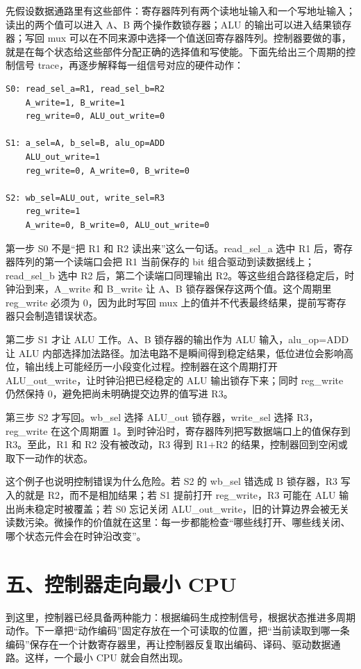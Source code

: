 先假设数据通路里有这些部件：寄存器阵列有两个读地址输入和一个写地址输入；读出的两个值可以进入 A、B 两个操作数锁存器；ALU 的输出可以进入结果锁存器；写回 mux 可以在不同来源中选择一个值送回寄存器阵列。控制器要做的事，就是在每个状态给这些部件分配正确的选择值和写使能。下面先给出三个周期的控制信号 trace，再逐步解释每一组信号对应的硬件动作：

\begin{lstlisting}
S0: read_sel_a=R1, read_sel_b=R2
    A_write=1, B_write=1
    reg_write=0, ALU_out_write=0

S1: a_sel=A, b_sel=B, alu_op=ADD
    ALU_out_write=1
    reg_write=0, A_write=0, B_write=0

S2: wb_sel=ALU_out, write_sel=R3
    reg_write=1
    A_write=0, B_write=0, ALU_out_write=0
\end{lstlisting}

第一步 S0 不是“把 R1 和 R2 读出来”这么一句话。read\_sel\_a 选中 R1 后，寄存器阵列的第一个读端口会把 R1 当前保存的 bit 组合驱动到读数据线上；read\_sel\_b 选中 R2 后，第二个读端口同理输出 R2。等这些组合路径稳定后，时钟沿到来，A\_write 和 B\_write 让 A、B 锁存器保存这两个值。这个周期里 reg\_write 必须为 0，因为此时写回 mux 上的值并不代表最终结果，提前写寄存器只会制造错误状态。

第二步 S1 才让 ALU 工作。A、B 锁存器的输出作为 ALU 输入，alu\_op=ADD 让 ALU 内部选择加法路径。加法电路不是瞬间得到稳定结果，低位进位会影响高位，输出线上可能经历一小段变化过程。控制器在这个周期打开 ALU\_out\_write，让时钟沿把已经稳定的 ALU 输出锁存下来；同时 reg\_write 仍然保持 0，避免把尚未明确提交边界的值写进 R3。

第三步 S2 才写回。wb\_sel 选择 ALU\_out 锁存器，write\_sel 选择 R3，reg\_write 在这个周期置 1。到时钟沿时，寄存器阵列把写数据端口上的值保存到 R3。至此，R1 和 R2 没有被改动，R3 得到 R1+R2 的结果，控制器回到空闲或取下一动作的状态。

这个例子也说明控制错误为什么危险。若 S2 的 wb\_sel 错选成 B 锁存器，R3 写入的就是 R2，而不是相加结果；若 S1 提前打开 reg\_write，R3 可能在 ALU 输出尚未稳定时被覆盖；若 S0 忘记关闭 ALU\_out\_write，旧的计算边界会被无关读数污染。微操作的价值就在这里：每一步都能检查“哪些线打开、哪些线关闭、哪个状态元件会在时钟沿改变”。

\section{五、控制器走向最小 CPU}

到这里，控制器已经具备两种能力：根据编码生成控制信号，根据状态推进多周期动作。下一章把“动作编码”固定存放在一个可读取的位置，把“当前读取到哪一条编码”保存在一个计数寄存器里，再让控制器反复取出编码、译码、驱动数据通路。这样，一个最小 CPU 就会自然出现。

